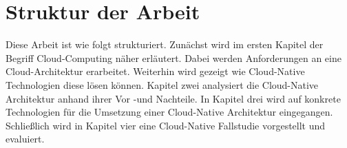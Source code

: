 \section{Struktur der Arbeit}
Diese Arbeit ist wie folgt strukturiert. Zunächst wird im ersten Kapitel der Begriff Cloud-Computing näher erläutert. Dabei werden Anforderungen an eine Cloud-Architektur erarbeitet. Weiterhin wird gezeigt wie Cloud-Native Technologien diese lösen können. Kapitel zwei analysiert die Cloud-Native Architektur anhand ihrer Vor -und Nachteile. In Kapitel drei wird auf konkrete Technologien für die Umsetzung einer Cloud-Native Architektur eingegangen. Schließlich wird in Kapitel vier eine Cloud-Native Fallstudie vorgestellt und evaluiert.  

